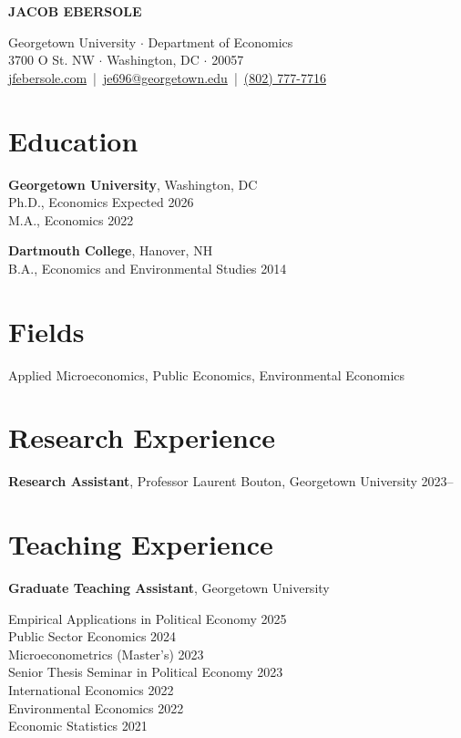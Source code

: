 \documentclass[11pt]{article}
\newcommand{\header}[2]{
    \begin{center}
        {\LARGE \textbf{#1}} \\
        \vspace{10pt}
        #2
    \end{center}
}
\begin{document}
\header{JACOB EBERSOLE}{
  Georgetown University $\cdot$ Department of Economics \\
  3700 O St. NW $\cdot$ Washington, DC $\cdot$ 20057 \\
  \vspace{6pt}
  \href{https://jfebersole.com}{jfebersole.com} \,|\, 
  \href{mailto:je696@georgetown.edu}{je696@georgetown.edu} \,|\, 
  \href{tel:+18027777716}{(802) 777-7716}
}

\section*{Education}

\textbf{Georgetown University}, Washington, DC \\
Ph.D., Economics \hfill Expected 2026 \\
M.A., Economics \hfill 2022

\textbf{Dartmouth College}, Hanover, NH \\
B.A., Economics and Environmental Studies \hfill 2014

\section*{Fields}
Applied Microeconomics, Public Economics, Environmental Economics
\section*{Research Experience}

\textbf{Research Assistant}, Professor Laurent Bouton, Georgetown University \hfill 2023–

\section*{Teaching Experience}

\textbf{Graduate Teaching Assistant}, Georgetown University

Empirical Applications in Political Economy \hfill 2025 \\
Public Sector Economics \hfill 2024 \\
Microeconometrics (Master's) \hfill 2023 \\
Senior Thesis Seminar in Political Economy \hfill 2023 \\
International Economics \hfill 2022 \\
Environmental Economics \hfill 2022 \\
Economic Statistics \hfill 2021
\end{document}
